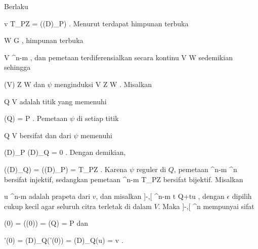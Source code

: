 

Berlaku

\mavergleichskettedisp
{\vergleichskette
{ v
}
{ \in }{ T_PZ
}
{ = }{  \left((D\varphi)_P\right)
}
{ } {
}
{ } {
}
}
{}{}{.}
Menurut
terdapat himpunan terbuka

 {}
 {W \subseteq G} {}
 {} {} {} {,}
himpunan terbuka

\mavergleichskette
{\vergleichskette
{ V
}
{ \subseteq }{ \R^{n-m}
}
{ } {
}
{ } {
}
{ } {
}
}
{}{}{,}
dan pemetaan terdiferensialkan secara kontinu
\maabbdisp {\psi} { V } { W } {}
sedemikian sehingga

\mavergleichskette
{\vergleichskette
{ \psi(V)
}
{ \subseteq }{ Z \cap W
}
{ } {
}
{ } {
}
{ } {
}
}
{}{}{}
dan $\psi$ menginduksi
\maabbdisp {\psi} { V } { Z \cap W } {}.
Misalkan

\mavergleichskette
{\vergleichskette
{ Q
}
{ \in }{ V
}
{ } {
}
{ } {
}
{ } {
}
}
{}{}{}
adalah titik yang memenuhi

\mavergleichskettedisp
{\vergleichskette
{ \psi(Q)
}
{ =} { P
}
{ } {
}
{ } {
}
{ } {
}
}
{}{}{.}
Pemetaan $\psi$ di setiap titik

\mavergleichskette
{\vergleichskette
{ Q
}
{ \in }{ V
}
{ } {
}
{ } {
}
{ } {
}
}
{}{}{}
bersifat
dan
dari $\psi$ memenuhi

\mavergleichskettedisp
{\vergleichskette
{ (D\varphi)_P \circ (D\psi)_Q
}
{ =} { 0
}
{ } {
}
{ } {
}
{ } {
}
}
{}{}{.}
Dengan demikian,

\mavergleichskettedisp
{\vergleichskette
{  \left((D\psi)_Q\right)
}
{ =} {  \left((D\varphi)_P\right)
}
{ =} { T_PZ
}
{ } {
}
{ } {
}
}
{}{}{.}
Karena $\psi$ reguler di $Q$, pemetaan
 { \R^{n-m} } { \R^n } {}
bersifat injektif, sedangkan pemetaan
 { \R^{n-m} } { T_PZ } {}
bersifat bijektif. Misalkan

\mavergleichskette
{\vergleichskette
{ u
}
{ \in }{ \R^{n-m}
}
{ } {
}
{ } {
}
{ } {
}
}
{}{}{}
adalah prapeta dari $v$, dan misalkan
\maabbeledisp {\theta} { ]-\epsilon,\epsilon[ } { \R^{n-m} } {t} {Q+tu} {,}
dengan $\epsilon$ dipilih cukup kecil agar seluruh citra terletak di dalam $V$. Maka
\maabbdisp {\gamma=\psi\circ\theta} { ]-\epsilon,\epsilon[ } { \R^n } {}
mempunyai sifat

\mavergleichskettedisp
{\vergleichskette
{ \gamma(0)
}
{ =} { \psi(\theta(0))
}
{ =} { \psi(Q)
}
{ =} { P
}
{ } {
}
}
{}{}{}
dan

\mavergleichskettedisp
{\vergleichskette
{ \gamma'(0)
}
{ =} { (D\psi)_Q(\theta'(0))
}
{ =} { (D\psi)_Q(u)
}
{ =} { v
}
{ } {
}
}
{}{}{.}
